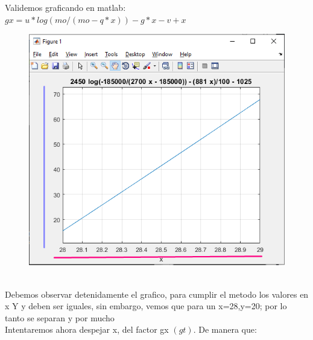 \documentclass{article}
\theoremstyle{mytheoremstyle}
\theoremstyle{mytheoremstyle}
\theoremstyle{myproblemstyle}
\begin{document}
Validemos graficando en matlab: $gx=u*log(mo/(mo-q*x))-g*x-v+x$
\begin{figure}[ht]
    \includegraphics[scale=0.5]{img/stf28_3.png}
    
\end{figure}
\\Debemos observar detenidamente el grafico, para cumplir el metodo los valores en x Y y
    deben ser iguales, sin embargo, vemos que para un x=28,y=20; por lo tanto se separan y por
    mucho
\\Intentaremos ahora despejar x, del factor gx $(gt)$. De manera que:
\end{document}

